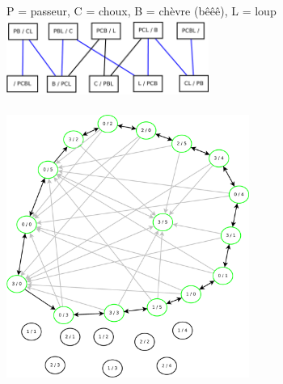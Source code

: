  P = passeur, C = choux, B = chèvre (bêêê), L = loup \\
\includegraphics[width=250px]{Images/fig27.pdf} \\

 \\
\includegraphics[width=300px]{Images/fig28.pdf} \\
